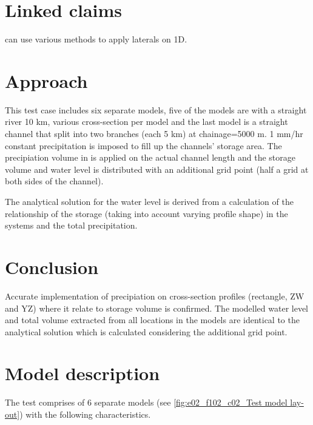 \section*{Linked claims}
\dflowfm can use various methods to apply laterals on 1D.
\section*{Approach}
This test case includes six separate models, five of the models are with a straight river 10 km, various cross-section per model and the last model is a straight channel that split into two branches (each 5 km) at chainage=5000 m.
1 mm/hr constant precipitation is imposed to fill up the channels' storage area. The precipiation volume in \dflowfm is applied on the actual channel length and the storage volume and water level is distributed with an additional grid point (half a grid at both sides of the channel).

The analytical solution for the water level is derived from a calculation of the relationship of the storage (taking into account varying profile shape) in the systems and the total precipitation.

\section*{Conclusion} 
Accurate implementation of precipiation on cross-section profiles (rectangle, ZW and YZ) where it relate to storage volume is confirmed. 
The modelled water level and total volume extracted from all locations in the models are identical to the analytical solution which is calculated considering the \dflowfm additional grid point.

\section*{Model description}
The test comprises of 6 separate models (see \autoref{fig:e02_f102_c02_Test model lay-out}) with the following characteristics.

